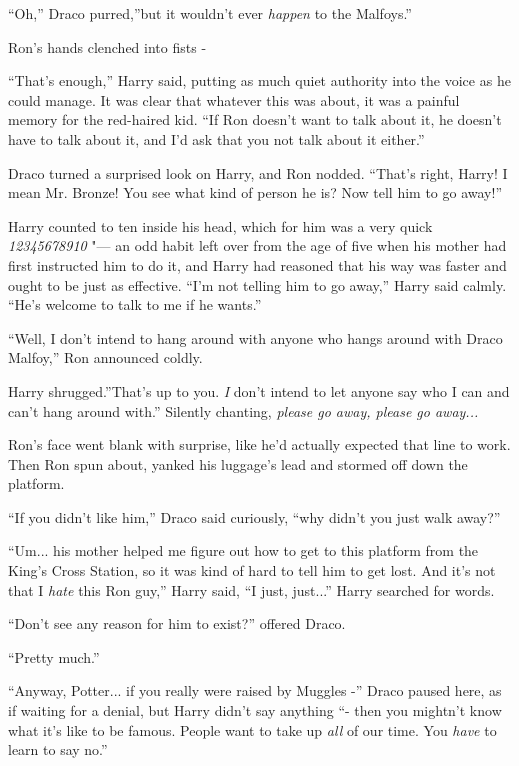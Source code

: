 ``Oh,'' Draco purred,''but it wouldn't ever \emph{happen} to the
Malfoys.''

Ron's hands clenched into fists -

``That's enough,'' Harry said, putting as much quiet authority into the
voice as he could manage. It was clear that whatever this was about, it
was a painful memory for the red-haired kid. ``If Ron doesn't want to
talk about it, he doesn't have to talk about it, and I'd ask that you
not talk about it either.''

Draco turned a surprised look on Harry, and Ron nodded. ``That's right,
Harry! I mean Mr. Bronze! You see what kind of person he is? Now tell
him to go away!''

Harry counted to ten inside his head, which for him was a very quick
\emph{12345678910} "--- an odd habit left over from the age of five when
his mother had first instructed him to do it, and Harry had reasoned
that his way was faster and ought to be just as effective. ``I'm not
telling him to go away,'' Harry said calmly. ``He's welcome to talk to
me if he wants.''

``Well, I don't intend to hang around with anyone who hangs around with
Draco Malfoy,'' Ron announced coldly.

Harry shrugged.''That's up to you. \emph{I} don't intend to let anyone
say who I can and can't hang around with.'' Silently chanting,
\emph{please go away, please go away...}

Ron's face went blank with surprise, like he'd actually expected that
line to work. Then Ron spun about, yanked his luggage's lead and stormed
off down the platform.

``If you didn't like him,'' Draco said curiously, ``why didn't you just
walk away?''

``Um... his mother helped me figure out how to get to this platform
from the King's Cross Station, so it was kind of hard to tell him to get
lost. And it's not that I \emph{hate} this Ron guy,'' Harry said, ``I
just, just...'' Harry searched for words.

``Don't see any reason for him to exist?'' offered Draco.

``Pretty much.''

``Anyway, Potter... if you really were raised by Muggles -'' Draco
paused here, as if waiting for a denial, but Harry didn't say anything
``- then you mightn't know what it's like to be famous. People want to
take up \emph{all} of our time. You \emph{have} to learn to say no.''

